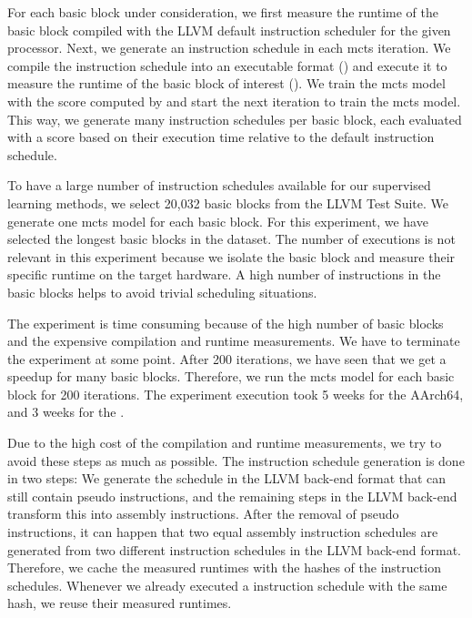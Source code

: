 For each basic block under consideration, we first measure the runtime of the basic block compiled with the LLVM default instruction scheduler for the given processor.
Next, we generate an instruction schedule in each \ac{mcts} iteration.
We compile the instruction schedule into an executable format () and execute it to measure the runtime of the basic block of interest ().
We train the \ac{mcts} model with the score computed by  and start the next iteration to train the \ac{mcts} model.
This way, we generate many instruction schedules per basic block, each evaluated with a score based on their execution time relative to the default instruction schedule.


To have a large number of instruction schedules available for our supervised learning methods, we select 20,032 basic blocks from the LLVM Test Suite. 
We generate one \ac{mcts} model for each basic block.
For this experiment, we have selected the longest basic blocks in the dataset.
The number of executions is not relevant in this experiment because we isolate the basic block and measure their specific runtime on the target hardware.
A high number of instructions in the basic blocks helps to avoid trivial scheduling situations.

The experiment is time consuming because of the high number of basic blocks and the expensive compilation and runtime measurements.
We have to terminate the experiment at some point.
After 200 iterations, we have seen that we get a speedup for many basic blocks.
Therefore, we run the \ac{mcts} model for each basic block for 200 iterations.
The experiment execution took 5 weeks for the AArch64, and 3 weeks for the \aurora.


Due to the high cost of the compilation and runtime measurements, we try to avoid these steps as much as possible.
The instruction schedule generation is done in two steps:
We generate the schedule in the LLVM back-end format that can still contain pseudo instructions, and the remaining steps in the LLVM back-end transform this into assembly instructions.
After the removal of pseudo instructions, it can happen that two equal assembly instruction schedules are generated from two different instruction schedules in the LLVM back-end format.
Therefore, we cache the measured runtimes with the hashes of the instruction schedules.
Whenever we already executed a instruction schedule with the same hash, we reuse their measured runtimes.

